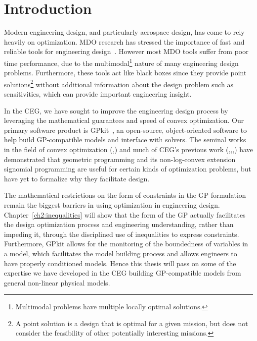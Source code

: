 \chapter{Introduction}
\label{ch1_intro}

Modern engineering design, and particularly aerospace design, has come to rely
heavily on optimization. \gls{MDO} research has stressed
the importance of fast and
reliable tools for engineering design~\cite{martins_mdo}.
However most \gls{MDO} tools
suffer from poor time performance,
due to the multimodal\footnote{Multimodal problems have multiple
locally optimal solutions.} nature of many
engineering design problems.
Furthermore, these tools act like black boxes since
they provide point solutions\footnote{A point solution is a design that
is optimal for a given mission, but does not consider the
feasibility of other potentially interesting missions.}
without additional information about the design problem
such as sensitivities,
which can provide important engineering insight.

In the \gls{CEG}, we have sought to improve the engineering design process by
leveraging the mathematical guarantees and speed of convex optimization.
Our primary software product is GPkit~\cite{gpkit}, an
open-source, object-oriented software to help build \gls{GP}-compatible models and
interface with solvers. The seminal works
in the field of convex optimization (\cite{gpintro},\cite{duffingp}) and much of \gls{CEG}'s previous work
(\cite{gp_ac_design},\cite{power_of_log},\cite{sp_ac_design},\cite{sp_engine}) have demonstrated that
geometric programming and its non-log-convex extension signomial programming
are useful for certain kinds of
optimization problems, but have yet to formalize why they
facilitate design.

The mathematical restrictions on the form of constraints in the \gls{GP} formulation
remain the biggest
barriers in using optimization in engineering design. Chapter~\ref{ch2:inequalities} will
show that the form of the \gls{GP} actually facilitates the design
optimization process
and engineering understanding, rather than impeding it, through the disciplined use
of inequalities to express constraints.
Furthermore, GPkit allows for the
monitoring of the boundedness of variables in a model, which facilitates the model
building process and allows engineers
to have properly conditioned models. Hence this thesis will
pass on some of the expertise we have developed in the \gls{CEG} building
\gls{GP}-compatible models from general non-linear physical models.

